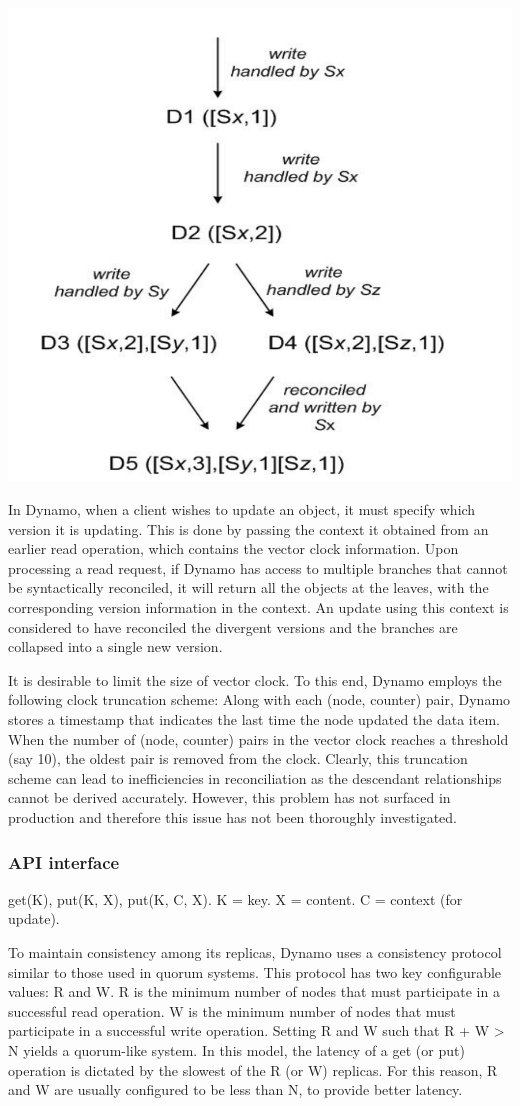 \includegraphics[width=0.5\linewidth]{img/vector_clocks.png}

In Dynamo, when a client wishes to update an object, it must
specify which version it is updating. This is done by passing the
context it obtained from an earlier read operation, which contains
the vector clock information. Upon processing a read request, if 
Dynamo has access to multiple branches that cannot be
syntactically reconciled, it will return all the objects at the leaves,
with the corresponding version information in the context. An
update using this context is considered to have reconciled the
divergent versions and the branches are collapsed into a single
new version.

It is desirable to limit the size of vector clock. To this
end, Dynamo employs the following clock truncation scheme:
Along with each (node, counter) pair, Dynamo stores a timestamp
that indicates the last time the node updated the data item. When
the number of (node, counter) pairs in the vector clock reaches a
threshold (say 10), the oldest pair is removed from the clock.
Clearly, this truncation scheme can lead to inefficiencies in
reconciliation as the descendant relationships cannot be derived
accurately. However, this problem has not surfaced in production
and therefore this issue has not been thoroughly investigated. 

\subsubsection{API interface}

get(K), put(K, X), put(K, C, X). K = key. X = content. C = context (for update).

To maintain consistency among its replicas, Dynamo uses a
consistency protocol similar to those used in quorum systems.
This protocol has two key configurable values: R and W. R is the
minimum number of nodes that must participate in a successful
read operation. W is the minimum number of nodes that must
participate in a successful write operation. Setting R and W such
that R + W > N yields a quorum-like system. In this model, the
latency of a get (or put) operation is dictated by the slowest of the
R (or W) replicas. For this reason, R and W are usually
configured to be less than N, to provide better latency. 

